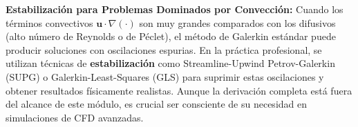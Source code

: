 \begin{notatecnica}
    \textbf{Estabilización para Problemas Dominados por Convección:}
    Cuando los términos convectivos $\mathbf{u} \cdot \nabla(\cdot)$ son muy grandes comparados con los difusivos (alto número de Reynolds o de Péclet), el método de Galerkin estándar puede producir soluciones con oscilaciones espurias. En la práctica profesional, se utilizan técnicas de \textbf{estabilización} como Streamline-Upwind Petrov-Galerkin (SUPG) o Galerkin-Least-Squares (GLS) para suprimir estas oscilaciones y obtener resultados físicamente realistas. Aunque la derivación completa está fuera del alcance de este módulo, es crucial ser consciente de su necesidad en simulaciones de CFD avanzadas.
\end{notatecnica}
